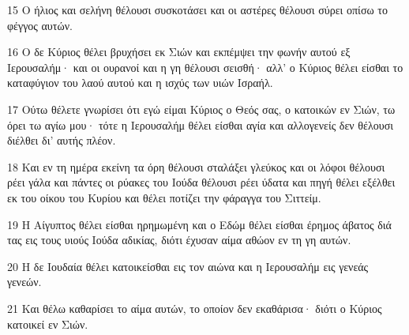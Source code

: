\par 15 Ο ήλιος και σελήνη θέλουσι συσκοτάσει και οι αστέρες θέλουσι σύρει οπίσω το φέγγος αυτών.
\par 16 Ο δε Κύριος θέλει βρυχήσει εκ Σιών και εκπέμψει την φωνήν αυτού εξ Ιερουσαλήμ· και οι ουρανοί και η γη θέλουσι σεισθή· αλλ' ο Κύριος θέλει είσθαι το καταφύγιον του λαού αυτού και η ισχύς των υιών Ισραήλ.
\par 17 Ούτω θέλετε γνωρίσει ότι εγώ είμαι Κύριος ο Θεός σας, ο κατοικών εν Σιών, τω όρει τω αγίω μου· τότε η Ιερουσαλήμ θέλει είσθαι αγία και αλλογενείς δεν θέλουσι διέλθει δι' αυτής πλέον.
\par 18 Και εν τη ημέρα εκείνη τα όρη θέλουσι σταλάξει γλεύκος και οι λόφοι θέλουσι ρέει γάλα και πάντες οι ρύακες του Ιούδα θέλουσι ρέει ύδατα και πηγή θέλει εξέλθει εκ του οίκου του Κυρίου και θέλει ποτίζει την φάραγγα του Σιττείμ.
\par 19 Η Αίγυπτος θέλει είσθαι ηρημωμένη και ο Εδώμ θέλει είσθαι έρημος άβατος διά τας εις τους υιούς Ιούδα αδικίας, διότι έχυσαν αίμα αθώον εν τη γη αυτών.
\par 20 Η δε Ιουδαία θέλει κατοικείσθαι εις τον αιώνα και η Ιερουσαλήμ εις γενεάς γενεών.
\par 21 Και θέλω καθαρίσει το αίμα αυτών, το οποίον δεν εκαθάρισα· διότι ο Κύριος κατοικεί εν Σιών.


